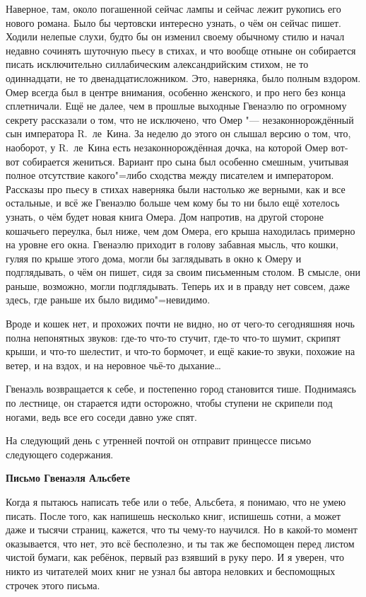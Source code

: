 Наверное, там, около погашенной сейчас лампы и сейчас лежит рукопись его нового
романа.
Было бы чертовски интересно узнать, о чём он сейчас пишет.
Ходили нелепые слухи, будто бы он изменил своему обычному стилю и начал недавно
сочинять шуточную пьесу в стихах, и что вообще отныне он собирается писать
исключительно силлабическим александрийским стихом, не то одиннадцати, не то
двенадцатисложником.
Это, наверняка, было полным вздором.
Омер всегда был в центре внимания, особенно женского, и про него без конца
сплетничали.
Ещё не далее, чем в прошлые выходные Гвенаэлю по огромному секрету рассказали о
том, что не исключено, что Омер "--- незаконнорождённый сын императора
R.~ле~Кина.
За неделю до этого он слышал версию о том, что, наоборот, у R.~ле~Кина есть
незаконнорождённая дочка, на которой Омер вот-вот собирается жениться.
Вариант про сына был особенно смешным, учитывая полное отсутствие какого"=либо
сходства между писателем и императором.
Рассказы про пьесу в стихах наверняка были настолько же верными, как и все
остальные, и всё же Гвенаэлю больше чем кому бы то ни было ещё хотелось узнать,
о чём будет новая книга Омера.
Дом напротив, на другой стороне кошачьего переулка, был ниже, чем дом Омера,
его крыша находилась примерно на уровне его окна.
Гвенаэлю приходит в голову забавная мысль, что кошки, гуляя по крыше этого дома,
могли бы заглядывать в окно к Омеру и подглядывать, о чём он пишет, сидя за своим
письменным столом.
В смысле, они раньше, возможно, могли подглядывать.
Теперь их и в правду нет совсем, даже здесь, где раньше их было видимо"=невидимо.

Вроде и кошек нет, и прохожих почти не видно, но от чего-то сегодняшняя ночь
полна непонятных звуков: где-то что-то стучит, где-то что-то шумит, скрипят
крыши, и что-то шелестит, и что-то бормочет, и ещё какие-то звуки, похожие на
ветер, и на вздох, и на неровное чьё-то дыхание\ldots

Гвенаэль возвращается к себе, и постепенно город становится тише.
Поднимаясь по лестнице, он старается идти осторожно, чтобы ступени не скрипели
под ногами, ведь все его соседи давно уже спят.

На следующий день с утренней почтой он отправит принцессе письмо следующего
содержания.

\medskip
\begin{center}
\textbf{Письмо Гвенаэля Альсбете}
\end{center}

\medskip
Когда я пытаюсь написать тебе или о тебе, Альсбета, я понимаю, что не умею
писать.
После того, как напишешь несколько книг, испишешь сотни, а может даже и тысячи
страниц, кажется, что ты чему-то научился.
Но в какой-то момент оказывается, что нет, это всё бесполезно, и ты так же
беспомощен перед листом чистой бумаги, как ребёнок, первый раз взявший в руку
перо.
И я уверен, что никто из читателей моих книг не узнал бы автора неловких и
беспомощных строчек этого письма.

